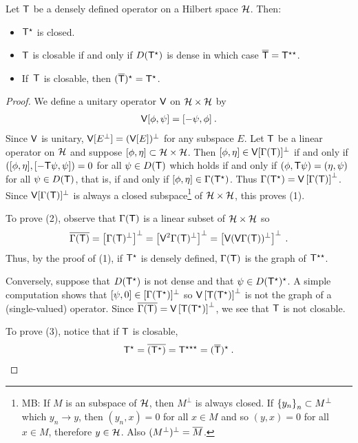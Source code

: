 \begin{theorem}
Let $\mathsf{T}$ be a densely defined operator on a Hilbert space $\mathcal{H}$. Then:
\begin{itemize}
    \item $\mathsf{T}^\star$ is closed.
    \item $\mathsf{T}$ is closable if and only if $D(\mathsf{T}^\star)$ is dense in which case $\overline{\mathsf{T}} = \mathsf{T}^{\star \star}$.
    \item If \,$\mathsf{T}$ is closable, then $(\overline{\mathsf{T}})^\star = \mathsf{T}^\star$.
\end{itemize}

\end{theorem}

\begin{proof}
We define a unitary operator $\mathsf{V}$ on $\mathcal{H} \times \mathcal{H}$ by
\begin{align}
    \mathsf{V} [\phi, \psi] = [-\psi, \phi] \:.
\end{align}
Since $\mathsf{V}$ is unitary, $\mathsf{V}[E^\bot] = (\mathsf{V}[E])^\bot$ for any subspace $E$. Let $\mathsf{T}$ be a linear operator on $\mathcal{H}$ and suppose $[\phi, \eta] \subset \mathcal{H} \times \mathcal{H}$. Then $[\phi, \eta] \in \mathsf{V}[\Gamma(\mathsf{T})]^\bot$ if and only if $\left( [\phi, \eta], [- \mathsf{T} \psi, \psi] \right) = 0$ for all $\psi \in D(\mathsf{T})$ which holds if and only if $(\phi, \mathsf{T} \psi) = (\eta, \psi)$ for all $\psi \in D(\mathsf{T})$, that is, if and only if $[\phi, \eta] \in \Gamma(\mathsf{T}^\star)$. Thus $\Gamma(\mathsf{T}^\star) = \mathsf{V} \left[\Gamma(\mathsf{T}) \right]^\bot$. 
Since $\mathsf{V}[\Gamma(\mathsf{T})]^\bot$ is always a closed subspace\footnote[1]{MB: If $M$ is an subspace of $\mathcal{H}$, then $M^\bot$ is always closed. If $\left \lbrace y_n \right \rbrace_n \subset M^\bot$ which $y_n \rightarrow y$, then $(y_n,x) = 0$ for all $x \in M$ and so $(y,x) = 0$ for all $x \in M$, therefore $y \in \mathcal{H}$. Also $(M^\bot)^\bot = \overline{M}$.} of $\mathcal{H} \times \mathcal{H}$, this proves (1).

To prove (2), observe that $\Gamma(\mathsf{T})$ is a linear subset of $\mathcal{H} \times \mathcal{H}$ so
\begin{align}
    \overline{\Gamma(\mathsf{T})} = \left[ \Gamma(\mathsf{T})^\bot \right]^\bot = \left[ \mathsf{V}^2 \Gamma(\mathsf{T})^\bot \right]^\bot = \left[ \mathsf{V}(\mathsf{V} \Gamma(\mathsf{T}))^\bot \right]^\bot \:.
\end{align}
Thus, by the proof of (1), if $\mathsf{T}^\star$ is densely defined, $\Gamma(\mathsf{T})$ is the graph of $\mathsf{T}^{\star \star}$.

Conversely, suppose that $D(\mathsf{T}^\star)$ is not dense and that $ \psi \in D(\mathsf{T}^\star)^\star$. A simple computation shows that $[\psi,0] \in [\Gamma(\mathsf{T}^\star)]^\bot$ so $\mathsf{V}\left[\mathsf{T}(\mathsf{T}^\star)\right]^\bot$ is not the graph of a (single-valued) operator. Since $\overline{\Gamma(\mathsf{T})} = \mathsf{V}\left[\mathsf{T}(\mathsf{T}^\star)\right]^\bot$, we see that $\mathsf{T}$ is not closable.

To prove (3), notice that if $\mathsf{T}$ is closable,
\begin{align}
    \mathsf{T}^\star = \overline{(\mathsf{T}^\star)} = \mathsf{T}^{\star \star \star} =(\overline{\mathsf{T}})^\star \:.
\end{align}
\end{proof}

